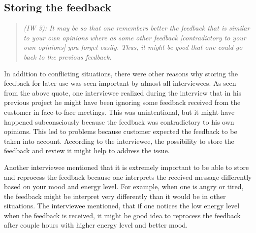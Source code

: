 \documentclass[english,12pt,a4paper,pdftex]{article}
\newcommand{\q}[2]{
\begin{quote}
\emph{(IW #1): #2}
\end{quote}}
\begin{document}
\subsection{Storing the feedback}

\q{3}{It may be so that one remembers better the feedback that is similar to your own opinions where as some other feedback [contradictory to your own opinions] you forget easily. Thus, it might be good that one could go back to the previous feedback.}

In addition to conflicting situations, there were other reasons why storing the feedback for later use was seen important by almost all interviewees. As seen from the above quote, one interviewee realized during the interview that in his previous project he might have been ignoring some feedback received from the customer in face-to-face meetings. This was unintentional, but it might have happened subconsciously because the feedback was contradictory to his own opinions. This led to problems because customer expected the feedback to be taken into account. According to the interviewee, the possibility to store the feedback and review it might help to address the issue.

Another interviewee mentioned that it is extremely important to be able to store and reprocess the feedback because one interprets the received message differently based on your mood and energy level. For example, when one is angry or tired, the feedback might be interpret very differently than it would be in other situations. The interviewee mentioned, that if one notices the low energy level when the feedback is received, it might be good idea to reprocess the feedback after couple hours with higher energy level and better mood.

\end{document}

